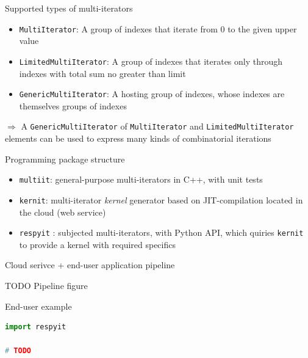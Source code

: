 \documentclass[aspectratio=169,twoside]{beamer}
\begin{document}
\begin{frame}[fragile]{Supported types of multi-iterators}

\begin{itemize}
\item \texttt{MultiIterator}: A group of indexes that iterate from 0 to the given upper value
\item \texttt{LimitedMultiIterator}: A group of indexes that iterates only through indexes with total sum no greater than limit
\item \texttt{GenericMultiIterator}: A hosting group of indexes, whose indexes are themselves groups of indexes
\end{itemize}

\vskip20pt

$\Rightarrow$ A \texttt{GenericMultiIterator} of \texttt{MultiIterator} and \texttt{LimitedMultiIterator} elements can be used to express many kinds of combinatorial iterations

\end{frame}



\begin{frame}[fragile]{Programming package structure}

\begin{itemize}
\item \texttt{multiit}: general-purpose multi-iterators in C++, with unit tests
\item \texttt{kernit}: multi-iterator \emph{kernel} generator based on JIT-compilation located in the cloud (web service)
\item \texttt{respyit} : subjected multi-iterators, with Python API, which quiries \texttt{kernit} to provide a kernel with required specifics
\end{itemize}

\end{frame}



\begin{frame}[fragile]{Cloud serivce + end-user application pipeline}

TODO Pipeline figure

\end{frame}



\begin{frame}[fragile]{End-user example}

\begin{lstlisting}[basicstyle=\tiny\ttfamily, language=python]
import respyit

# TODO
\end{lstlisting}

\end{frame}
\end{document}

